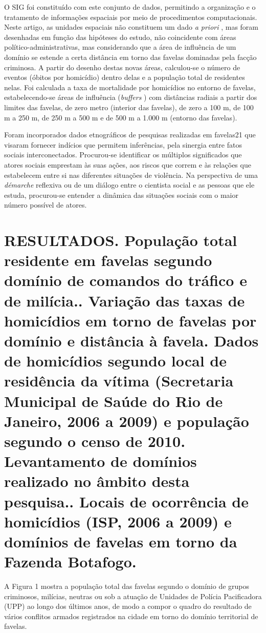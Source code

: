 \documentclass{article}
\begin{document}
O SIG foi constituído com este conjunto de dados, permitindo a organização e o
tratamento de informações espaciais por meio de procedimentos computacionais.
Neste artigo, as unidades espaciais não constituem um dado \textit{a priori}
, mas foram desenhadas em função das hipóteses do estudo, não coincidente com
áreas político-administrativas, mas considerando que a área de influência de um
domínio se estende a certa distância em torno das favelas dominadas pela facção
criminosa. A partir do desenho destas novas áreas, calculou-se o número de
eventos (óbitos por homicídio) dentro delas e a população total de residentes
nelas. Foi calculada a taxa de mortalidade por homicídios no entorno de favelas,
estabelecendo-se áreas de influência (\textit{buffers}
) com distâncias radiais a partir dos limites das favelas, de zero metro
(interior das favelas), de zero a 100 m, de 100 m a 250 m, de 250 m a 500 m e de
500 m a 1.000 m (entorno das favelas).

Foram incorporados dados etnográficos de pesquisas realizadas em favelas21 que
visaram fornecer indícios que permitem inferências, pela sinergia entre fatos
sociais interconectados. Procurou-se identificar os múltiplos significados que
atores sociais emprestam às suas ações, aos riscos que correm e às relações que
estabelecem entre si nas diferentes situações de violência. Na perspectiva de
uma \textit{démarche}
reflexiva ou de um diálogo entre o cientista social e as pessoas que ele estuda,
procurou-se entender a dinâmica das situações sociais com o maior número
possível de atores.

\section{RESULTADOS. População total residente em favelas segundo domínio de
comandos do tráfico e de milícia.. Variação das taxas de homicídios em torno de
favelas por domínio e distância à favela. Dados de homicídios segundo local de
residência da vítima (Secretaria Municipal de Saúde do Rio de Janeiro, 2006 a
2009) e população segundo o censo de 2010. Levantamento de domínios realizado no
âmbito desta pesquisa.. Locais de ocorrência de homicídios (ISP, 2006 a 2009) e
domínios de favelas em torno da Fazenda Botafogo.}

A Figura 1 mostra a população total das favelas segundo o domínio de grupos
criminosos, milícias, neutras ou sob a atuação de Unidades de Polícia
Pacificadora (UPP) ao longo dos últimos anos, de modo a compor o quadro do
resultado de vários conflitos armados registrados na cidade em torno do domínio
territorial de favelas.
\end{document}
